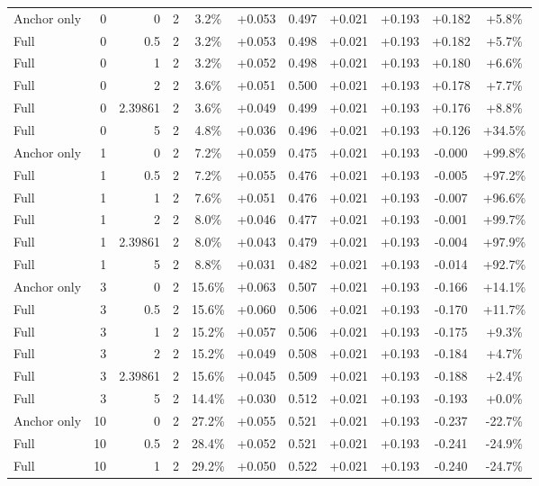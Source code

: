 \begin{table}[htbp]
\begin{tabular}{lrrrccccccc}
Anchor only & 0 & 0 & 2 & 3.2\% & +0.053 & 0.497 & +0.021 & +0.193 & +0.182 & +5.8\% \\
Full & 0 & 0.5 & 2 & 3.2\% & +0.053 & 0.498 & +0.021 & +0.193 & +0.182 & +5.7\% \\
Full & 0 & 1 & 2 & 3.2\% & +0.052 & 0.498 & +0.021 & +0.193 & +0.180 & +6.6\% \\
Full & 0 & 2 & 2 & 3.6\% & +0.051 & 0.500 & +0.021 & +0.193 & +0.178 & +7.7\% \\
Full & 0 & 2.39861 & 2 & 3.6\% & +0.049 & 0.499 & +0.021 & +0.193 & +0.176 & +8.8\% \\
Full & 0 & 5 & 2 & 4.8\% & +0.036 & 0.496 & +0.021 & +0.193 & +0.126 & +34.5\% \\
Anchor only & 1 & 0 & 2 & 7.2\% & +0.059 & 0.475 & +0.021 & +0.193 & -0.000 & +99.8\% \\
Full & 1 & 0.5 & 2 & 7.2\% & +0.055 & 0.476 & +0.021 & +0.193 & -0.005 & +97.2\% \\
Full & 1 & 1 & 2 & 7.6\% & +0.051 & 0.476 & +0.021 & +0.193 & -0.007 & +96.6\% \\
Full & 1 & 2 & 2 & 8.0\% & +0.046 & 0.477 & +0.021 & +0.193 & -0.001 & +99.7\% \\
Full & 1 & 2.39861 & 2 & 8.0\% & +0.043 & 0.479 & +0.021 & +0.193 & -0.004 & +97.9\% \\
Full & 1 & 5 & 2 & 8.8\% & +0.031 & 0.482 & +0.021 & +0.193 & -0.014 & +92.7\% \\
Anchor only & 3 & 0 & 2 & 15.6\% & +0.063 & 0.507 & +0.021 & +0.193 & -0.166 & +14.1\% \\
Full & 3 & 0.5 & 2 & 15.6\% & +0.060 & 0.506 & +0.021 & +0.193 & -0.170 & +11.7\% \\
Full & 3 & 1 & 2 & 15.2\% & +0.057 & 0.506 & +0.021 & +0.193 & -0.175 & +9.3\% \\
Full & 3 & 2 & 2 & 15.2\% & +0.049 & 0.508 & +0.021 & +0.193 & -0.184 & +4.7\% \\
Full & 3 & 2.39861 & 2 & 15.6\% & +0.045 & 0.509 & +0.021 & +0.193 & -0.188 & +2.4\% \\
Full & 3 & 5 & 2 & 14.4\% & +0.030 & 0.512 & +0.021 & +0.193 & -0.193 & +0.0\% \\
Anchor only & 10 & 0 & 2 & 27.2\% & +0.055 & 0.521 & +0.021 & +0.193 & -0.237 & -22.7\% \\
Full & 10 & 0.5 & 2 & 28.4\% & +0.052 & 0.521 & +0.021 & +0.193 & -0.241 & -24.9\% \\
Full & 10 & 1 & 2 & 29.2\% & +0.050 & 0.522 & +0.021 & +0.193 & -0.240 & -24.7\% \\

\end{tabular}
\end{table}
